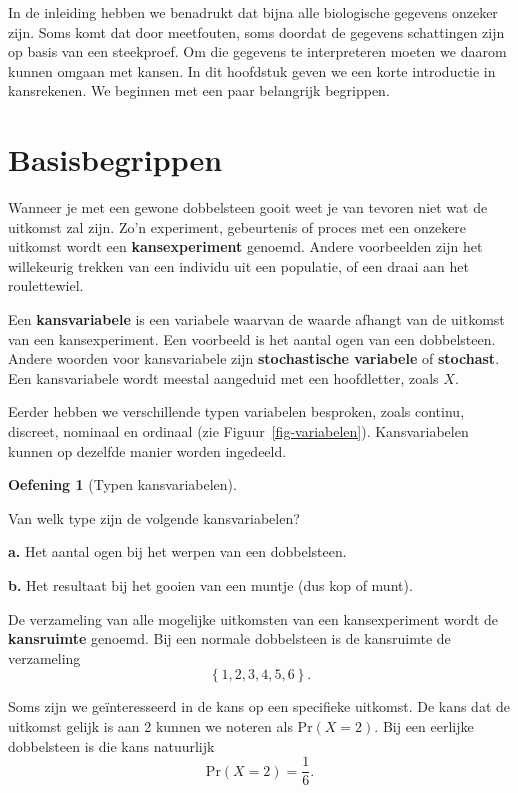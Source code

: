 \documentclass[
  a4paper,
]{scrbook}
\theoremstyle{definition}
\newtheorem{exercise}{Oefening}[chapter]
\theoremstyle{definition}
\theoremstyle{remark}
\begin{document}
In de inleiding hebben we benadrukt dat bijna alle biologische gegevens
onzeker zijn. Soms komt dat door meetfouten, soms doordat de gegevens
schattingen zijn op basis van een steekproef. Om die gegevens te
interpreteren moeten we daarom kunnen omgaan met kansen. In dit
hoofdstuk geven we een korte introductie in kansrekenen. We beginnen met
een paar belangrijk begrippen.

\section{Basisbegrippen}\label{basisbegrippen}

Wanneer je met een gewone dobbelsteen gooit weet je van tevoren niet wat
de uitkomst zal zijn. Zo'n experiment, gebeurtenis of proces met een
onzekere uitkomst wordt een \textbf{kansexperiment} genoemd. Andere
voorbeelden zijn het willekeurig trekken van een individu uit een
populatie, of een draai aan het roulettewiel.

Een \textbf{kansvariabele} is een variabele waarvan de waarde afhangt
van de uitkomst van een kansexperiment. Een voorbeeld is het aantal ogen
van een dobbelsteen. Andere woorden voor kansvariabele zijn
\textbf{stochastische variabele} of \textbf{stochast}. Een kansvariabele
wordt meestal aangeduid met een hoofdletter, zoals \(X\).

Eerder hebben we verschillende typen variabelen besproken, zoals
continu, discreet, nominaal en ordinaal (zie
Figuur~\ref{fig-variabelen}). Kansvariabelen kunnen op dezelfde manier
worden ingedeeld.

\begin{exercise}[Typen
kansvariabelen]\protect\hypertarget{exr-type}{}\label{exr-type}

Van welk type zijn de volgende kansvariabelen?

\textbf{a.} Het aantal ogen bij het werpen van een dobbelsteen.

\textbf{b.} Het resultaat bij het gooien van een muntje (dus kop of
munt).

\end{exercise}

De verzameling van alle mogelijke uitkomsten van een kansexperiment
wordt de \textbf{kansruimte} genoemd. Bij een normale dobbelsteen is de
kansruimte de verzameling \[
    \left\{
        1, 2, 3, 4, 5, 6
    \right\}.
\]

Soms zijn we geïnteresseerd in de kans op een specifieke uitkomst. De
kans dat de uitkomst gelijk is aan 2 kunnen we noteren als
\(\textrm{Pr}\!\left(X = 2\right)\). Bij een eerlijke dobbelsteen is die
kans natuurlijk \[\textrm{Pr}\!\left(X = 2\right) =\frac{1}{6}.\]
\end{document}
